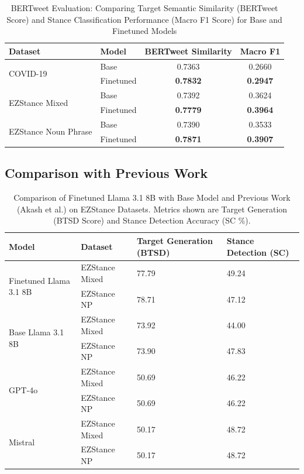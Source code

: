 \documentclass[twocolumn,11pt,letterpaper]{article}
\begin{document}
\begin{table}[!htbp]
\centering
\caption{BERTweet Evaluation: Comparing Target Semantic Similarity (BERTweet Score) and Stance Classification Performance (Macro F1 Score) for Base and Finetuned Models}
\label{tab:bertweet_results}
\begin{tabular}{@{}llcc@{}}
\toprule
\textbf{Dataset} & \textbf{Model} & \textbf{BERTweet Similarity} & \textbf{Macro F1} \\
\midrule
\multirow{2}{*}{COVID-19} 
& Base & 0.7363 & 0.2660 \\
& Finetuned & \textbf{0.7832} & \textbf{0.2947} \\
\midrule
\multirow{2}{*}{EZStance Mixed} 
& Base & 0.7392 & 0.3624 \\
& Finetuned & \textbf{0.7779} & \textbf{0.3964} \\
\midrule
\multirow{2}{*}{EZStance Noun Phrase} 
& Base & 0.7390 & 0.3533 \\
& Finetuned & \textbf{0.7871} & \textbf{0.3907} \\
\bottomrule
\end{tabular}
\end{table}

\subsection{Comparison with Previous Work}
\begin{table}[!htbp]
\centering
\caption{Comparison of Finetuned Llama 3.1 8B with Base Model and Previous Work (Akash et al.) on EZStance Datasets. Metrics shown are Target Generation (BTSD Score) and Stance Detection Accuracy (SC \%).}
\label{tab:comparison}
\begin{tabular}{|p{}|p{}|p{}|p{}|}
\hline
\textbf{Model} & \textbf{Dataset} & \textbf{Target Generation (BTSD)} & \textbf{Stance Detection (SC)} \\
\hline
\multirow{2}{*}{Finetuned Llama 3.1 8B} 
& EZStance Mixed & 77.79 & 49.24 \\
\cline{2-4}
& EZStance NP & 78.71 & 47.12 \\
\hline
\multirow{2}{*}{Base Llama 3.1 8B} 
& EZStance Mixed & 73.92 & 44.00 \\
\cline{2-4}
& EZStance NP & 73.90 & 47.83 \\
\hline
\multirow{2}{*}{GPT-4o~\cite{akash2024}} 
& EZStance Mixed & 50.69 & 46.22 \\
\cline{2-4}
& EZStance NP & 50.69 & 46.22 \\
\hline
\multirow{2}{*}{Mistral~\cite{akash2024}} 
& EZStance Mixed & 50.17 & 48.72 \\
\cline{2-4}
& EZStance NP & 50.17 & 48.72 \\
\hline
\end{tabular}
\end{table}
\end{document}
